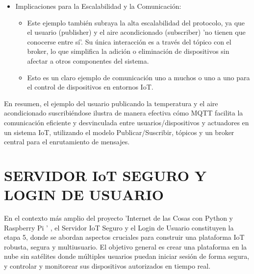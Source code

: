 \documentclass{report}
\begin{document}
\begin{itemize}
    \item Implicaciones para la Escalabilidad y la Comunicación:
        \begin{itemize}
            \item Este ejemplo también subraya la alta escalabilidad del protocolo, ya que el usuario (publisher) y el aire acondicionado 
            (subscriber) 'no tienen que conocerse entre sí'. Su única interacción es a través del tópico con el broker, lo que simplifica 
            la adición o eliminación de dispositivos sin afectar a otros componentes del sistema.
            \item Esto es un claro ejemplo de comunicación uno a muchos o uno a uno para el control de dispositivos en entornos IoT.
        \end{itemize}
\end{itemize}
En resumen, el ejemplo del usuario publicando la temperatura y el aire acondicionado suscribiéndose ilustra de manera efectiva cómo 
MQTT facilita la comunicación eficiente y desvinculada entre usuarios/dispositivos y actuadores en un sistema IoT, utilizando 
el modelo Publicar/Suscribir, tópicos y un broker central para el enrutamiento de mensajes.

\chapter{SERVIDOR IoT SEGURO Y LOGIN DE USUARIO}
En el contexto más amplio del proyecto   'Internet de las Cosas con Python y Raspberry Pi ' , el  Servidor IoT Seguro y el Login de Usuario  
constituyen la etapa 5, donde se abordan aspectos cruciales para construir una plataforma IoT robusta, segura y multiusuario. El objetivo general 
es crear una plataforma en la nube sin satélites donde múltiples usuarios puedan iniciar sesión de forma segura, y controlar y monitorear sus 
dispositivos autorizados en tiempo real.
\end{document}
